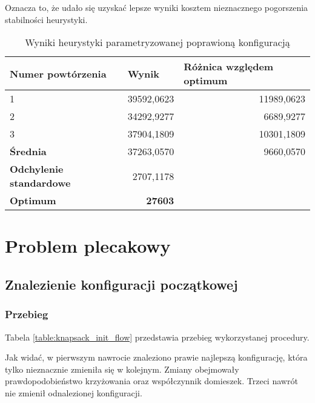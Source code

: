 \documentclass[./FM_mgr.tex]{subfiles}
\begin{document}
Oznacza to, że udało się uzyskać lepsze wyniki kosztem nieznacznego pogorszenia stabilności heurystyki.

\begin{table}[H]
	\caption{Wyniki heurystyki parametryzowanej poprawioną konfiguracją \label{table:tsp_tweak_results}}
	\centering
	\begin{tabular}{|l|r|r}
		\hline
		{\bf Numer powtórzenia}      & \multicolumn{1}{l|}{{\bf Wynik}} & \multicolumn{1}{l|}{{\bf Różnica względem optimum}} \\ \hline \hline
		1                            & 39592,0623                       & \multicolumn{1}{r|}{11989,0623}                     \\ \hline
		2                            & 34292,9277                       & \multicolumn{1}{r|}{6689,9277}                      \\ \hline
		3                            & 37904,1809                       & \multicolumn{1}{r|}{10301,1809}                     \\ \hline \hline
		{\bf Średnia}                & 37263,0570                       & \multicolumn{1}{r|}{9660,0570}                      \\ \hline
		{\bf Odchylenie standardowe} & 2707,1178                        &                                                     \\ \hhline{==~}
		{\bf Optimum}                & {\bf 27603}                      &                                                     \\ \cline{1-2}
	\end{tabular}
\end{table}

\section{Problem plecakowy}

\subsection{Znalezienie konfiguracji początkowej}

\subsubsection{Przebieg}


Tabela \ref{table:knapsack_init_flow} przedstawia przebieg wykorzystanej procedury.

Jak widać, w pierwszym nawrocie znaleziono prawie najlepszą konfigurację, która tylko nieznacznie zmieniła się w kolejnym. 
Zmiany obejmowały prawdopodobieństwo krzyżowania oraz współczynnik domieszek.
Trzeci nawrót nie zmienił odnalezionej konfiguracji.
\end{document}
